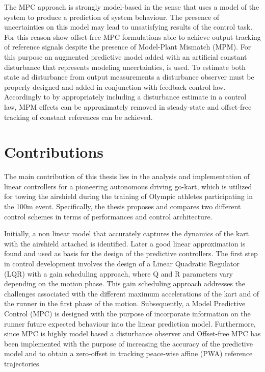 \documentclass[a4paper,12pt,oneside]{book}
\begin{document}
\bigskip
The MPC approach is strongly model-based in the sense that uses a model of the system to produce a prediction of system behaviour. The presence of uncertainties on this model may lead to unsatisfying results of the control task. 
For this reason \cite{Offset-free_compare, Linear_offset-free} show offset-free MPC formulations able to achieve output tracking of reference signals despite the presence of Model-Plant Mismatch (MPM).
For this purpose an augmented predictive model added with an artificial constant disturbance that represents modeling uncertainties, is used. 
To estimate both state ad disturbance from output measurements a disturbance observer must be properly designed and added in conjunction with feedback control law.
Accordingly to \cite{Disturbance_observer} by appropriately including a disturbance estimate in a control law, MPM effects can be approximately removed in steady-state and offset-free tracking of constant references can be achieved.


	
\section*{Contributions}
The main contribution of this thesis lies in the analysis and implementation of linear controllers for a pioneering autonomous driving go-kart, which is utilized for towing the airshield during the training of Olympic athletes participating in the 100m event.
Specifically, the thesis proposes and compares two different control schemes in terms of performances and control architecture.

\bigskip
Initially, a non linear model that accurately captures the dynamics of the kart with the airshield attached is identified. 
Later a good linear approximation is found and used as basis for the design of the predictive controllers.
The first step in control development involves the design of a Linear Quadratic Regulator (LQR) with a gain scheduling approach, where Q and R parameters vary depending on the motion phase. This gain scheduling approach addresses the challenges associated with the different maximum accelerations of the kart and of the runner in the first phase of the motion.
Subsequently, a Model Predictive Control (MPC) is designed with the purpose of incorporate information on the runner future expected behaviour into the linear prediction model.
Furthermore, since MPC is highly model based a disturbance observer and Offset-free MPC has been implemented with the purpose of increasing the accuracy of the predictive model and to obtain a zero-offset in tracking peace-wise affine (PWA) reference trajectories.
\end{document}
